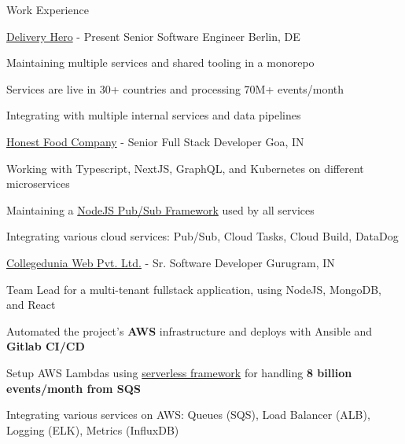 \documentclass[../resume.tex]{subfiles}
\begin{document}
\begin{rSection}{Work Experience}

\begin{rSubsection}
    {\href{https://www.deliveryhero.com/}{Delivery Hero}}
    {  - Present }
    {Senior Software Engineer}
    {Berlin, DE}

    \item Maintaining multiple services and shared tooling in a monorepo
    \item Services are live in 30+ countries and processing 70M+ events/month
    \item Integrating with multiple internal services and data pipelines

\end{rSubsection}

\begin{rSubsection}
    {\href{https://go.rohit.page/hfc}{Honest Food Company}}
    {  -  }
    {Senior Full Stack Developer}
    {Goa, IN}

    \item Working with Typescript, NextJS, GraphQL, and Kubernetes on different microservices
    \item Maintaining a \href{https://github.com/deliveryhero/hfc-pubsub}{NodeJS Pub/Sub Framework} used by all services
    \item Integrating various cloud services: Pub/Sub, Cloud Tasks, Cloud Build, DataDog

\end{rSubsection}

\begin{rSubsection}
    {\href{https://go.rohit.page/cd}{Collegedunia Web Pvt. Ltd.}}
    {  -  }
    {Sr. Software Developer}
    {Gurugram, IN}

    \item Team Lead for a multi-tenant fullstack application, using NodeJS, MongoDB, and React
    \item Automated the project's \textbf{AWS} infrastructure and deploys with Ansible and \textbf{Gitlab CI/CD}
    \item Setup AWS Lambdas using \href{https://www.serverless.com/}{serverless framework} for handling \textbf{8 billion events/month from SQS}
    \item Integrating various services on AWS: Queues (SQS), Load Balancer (ALB), Logging (ELK), Metrics (InfluxDB)


\end{rSubsection}
\end{rSection}
\end{document}
